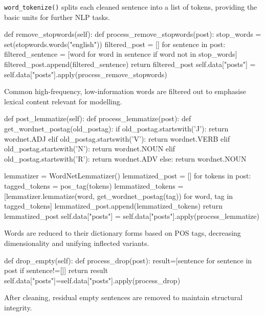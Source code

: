 \documentclass[12pt]{article}
\numberwithin{figure}{section}  %
\begin{document}
\begin{enumerate}
\texttt{word\_tokenize()} splits each cleaned sentence into a list of tokens,
providing the basic units for further NLP tasks.

\begin{python}
def remove_stopwords(self):
    def process_remove_stopwords(post):
        stop_words = set(stopwords.words("english"))
        filtered_post = []
        for sentence in post:
            filtered_sentence = [word for word in sentence if word not in stop_words]
            filtered_post.append(filtered_sentence)
        return filtered_post
    self.data["posts"] = self.data["posts"].apply(process_remove_stopwords)
\end{python}

Common high-frequency, low-information words are filtered out to emphasise
lexical content relevant for modelling.

\begin{python}
def post_lemmatize(self):
    def process_lemmatize(post):
        def get_wordnet_postag(old_postag):
            if old_postag.startswith('J'): return wordnet.ADJ
            elif old_postag.startswith('V'): return wordnet.VERB
            elif old_postag.startswith('N'): return wordnet.NOUN
            elif old_postag.startswith('R'): return wordnet.ADV
            else: return wordnet.NOUN

        lemmatizer = WordNetLemmatizer()
        lemmatized_post = []
        for tokens in post:
            tagged_tokens = pos_tag(tokens)
            lemmatized_tokens = [lemmatizer.lemmatize(word, get_wordnet_postag(tag)) for word, tag in tagged_tokens]
            lemmatized_post.append(lemmatized_tokens)
        return lemmatized_post
    self.data["posts"] = self.data["posts"].apply(process_lemmatize)
\end{python}

Words are reduced to their dictionary forms based on POS tags, decreasing
dimensionality and unifying inflected variants.

\begin{python}
def drop_empty(self):
        def process_drop(post):
            result=[sentence for sentence in post if sentence!=[]]
            return result        
        self.data["posts"]=self.data["posts"].apply(process_drop)
\end{python}

After cleaning, residual empty sentences are removed to maintain structural
integrity.


\end{enumerate}
\end{document}
